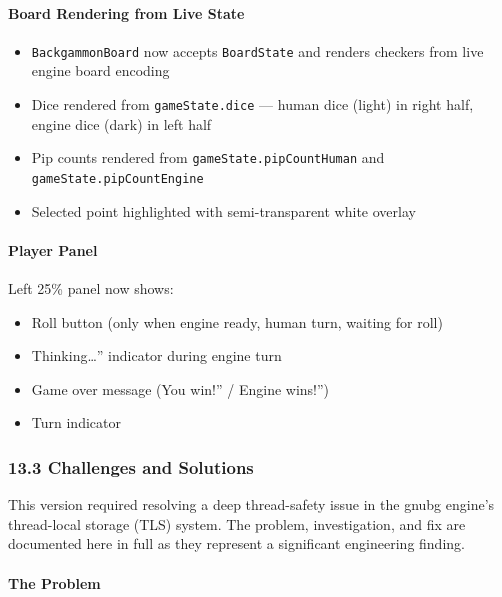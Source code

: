 \documentclass[11pt,a4paper]{article}
\providecommand{\tightlist}{\setlength{\itemsep}{2pt}\setlength{\parskip}{0pt}}
\begin{document}
\paragraph{Board Rendering from Live
State}\label{board-rendering-v093}

\begin{itemize}
\tightlist
\item
  \texttt{BackgammonBoard} now accepts \texttt{BoardState} and renders
  checkers from live engine board encoding
\item
  Dice rendered from \texttt{gameState.dice} --- human dice (light) in
  right half, engine dice (dark) in left half
\item
  Pip counts rendered from \texttt{gameState.pipCountHuman} and
  \texttt{gameState.pipCountEngine}
\item
  Selected point highlighted with semi-transparent white overlay
\end{itemize}

\paragraph{Player Panel}\label{player-panel-v093}

Left 25\% panel now shows:
\begin{itemize}
\tightlist
\item
  Roll button (only when engine ready, human turn, waiting for roll)
\item
  Thinking\ldots{}'' indicator during engine turn
\item
  Game over message (You win!'' / Engine wins!'')
\item
  Turn indicator
\end{itemize}

\subsubsection{13.3 Challenges and Solutions}\label{challenges-v093}

This version required resolving a deep thread-safety issue in the gnubg
engine's thread-local storage (TLS) system. The problem, investigation,
and fix are documented here in full as they represent a significant
engineering finding.

\paragraph{The Problem}\label{tls-problem}
\end{document}
